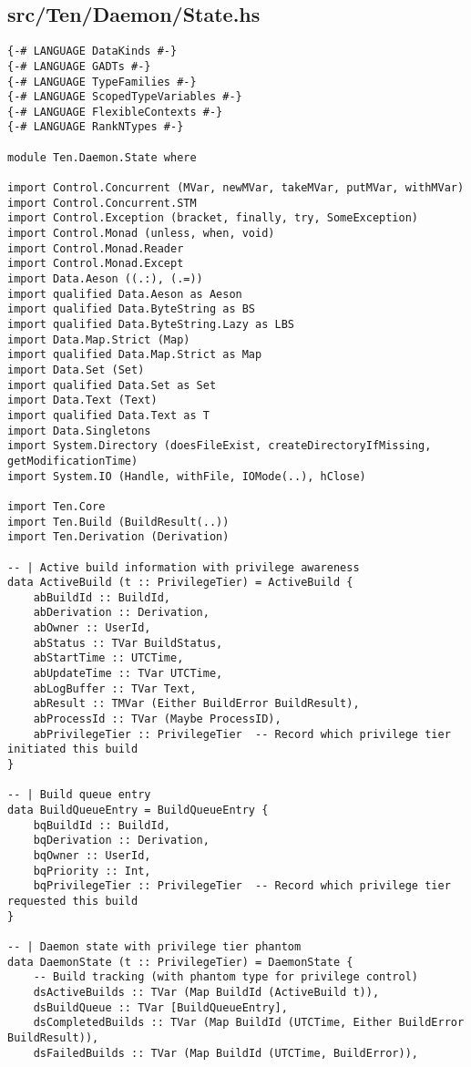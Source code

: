 \documentclass{article}
\begin{document}
\subsection{src/Ten/Daemon/State.hs}

\begin{tcolorbox}[title=Ten/Daemon/State.hs Changes]
\begin{verbatim}
{-# LANGUAGE DataKinds #-}
{-# LANGUAGE GADTs #-}
{-# LANGUAGE TypeFamilies #-}
{-# LANGUAGE ScopedTypeVariables #-}
{-# LANGUAGE FlexibleContexts #-}
{-# LANGUAGE RankNTypes #-}

module Ten.Daemon.State where

import Control.Concurrent (MVar, newMVar, takeMVar, putMVar, withMVar)
import Control.Concurrent.STM
import Control.Exception (bracket, finally, try, SomeException)
import Control.Monad (unless, when, void)
import Control.Monad.Reader
import Control.Monad.Except
import Data.Aeson ((.:), (.=))
import qualified Data.Aeson as Aeson
import qualified Data.ByteString as BS
import qualified Data.ByteString.Lazy as LBS
import Data.Map.Strict (Map)
import qualified Data.Map.Strict as Map
import Data.Set (Set)
import qualified Data.Set as Set
import Data.Text (Text)
import qualified Data.Text as T
import Data.Singletons
import System.Directory (doesFileExist, createDirectoryIfMissing, getModificationTime)
import System.IO (Handle, withFile, IOMode(..), hClose)

import Ten.Core
import Ten.Build (BuildResult(..))
import Ten.Derivation (Derivation)

-- | Active build information with privilege awareness
data ActiveBuild (t :: PrivilegeTier) = ActiveBuild {
    abBuildId :: BuildId,
    abDerivation :: Derivation,
    abOwner :: UserId,
    abStatus :: TVar BuildStatus,
    abStartTime :: UTCTime,
    abUpdateTime :: TVar UTCTime,
    abLogBuffer :: TVar Text,
    abResult :: TMVar (Either BuildError BuildResult),
    abProcessId :: TVar (Maybe ProcessID),
    abPrivilegeTier :: PrivilegeTier  -- Record which privilege tier initiated this build
}

-- | Build queue entry
data BuildQueueEntry = BuildQueueEntry {
    bqBuildId :: BuildId,
    bqDerivation :: Derivation,
    bqOwner :: UserId,
    bqPriority :: Int,
    bqPrivilegeTier :: PrivilegeTier  -- Record which privilege tier requested this build
}

-- | Daemon state with privilege tier phantom
data DaemonState (t :: PrivilegeTier) = DaemonState {
    -- Build tracking (with phantom type for privilege control)
    dsActiveBuilds :: TVar (Map BuildId (ActiveBuild t)),
    dsBuildQueue :: TVar [BuildQueueEntry],
    dsCompletedBuilds :: TVar (Map BuildId (UTCTime, Either BuildError BuildResult)),
    dsFailedBuilds :: TVar (Map BuildId (UTCTime, BuildError)),


\end{verbatim}
\end{tcolorbox}
\end{document}
